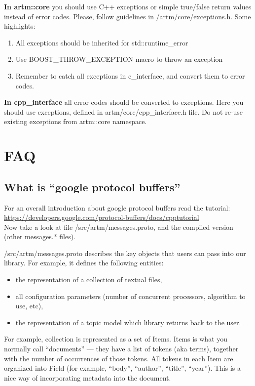 \documentclass[11pt,a4paper,twoside]{report}
\begin{document}
\textbf{In artm::core} you should use C++ exceptions
or simple true/false return values instead of error codes.
Please, follow guidelines in /artm/core/exceptions.h.
Some highlights:
\begin{enumerate}
    \item All exceptions should be inherited for std::runtime\_error
    \item Use BOOST\_THROW\_EXCEPTION macro to throw an exception
    \item Remember to catch all exceptions in c\_interface, and convert them to error codes.
\end{enumerate}

\textbf{In cpp\_interface} all error codes should be converted to exceptions.
Here you should use exceptions, defined in artm/core/cpp\_interface.h file.
Do not re-use existing exceptions from artm::core namespace.

\section{FAQ}

\subsection{What is ``google protocol buffers''}

For an overall introduction about google protocol buffers read the tutorial: \\
\url{https://developers.google.com/protocol-buffers/docs/cpptutorial} \\
Now take a look at file /src/artm/messages.proto,
and the compiled version (other messages.* files).

/src/artm/messages.proto describes the key objects that users can pass into our library.
For example, it defines the following entities:
\begin{itemize}
    \item the representation of a collection of textual files,
    \item all configuration parameters (number of concurrent processors, algorithm to use, etc),
    \item the representation of a topic model which library returns back to the user.
 \end{itemize}

For example, collection is represented as a set of Items.
Items is what you normally call ``documents'' --- they have a list of tokens (aka terms),
together with the number of occurrences of those tokens.
All tokens in each Item are organized into Field (for example, ``body'', ``author'', ``title'', ``year'').
This is a nice way of incorporating metadata into the document.
\end{document}
